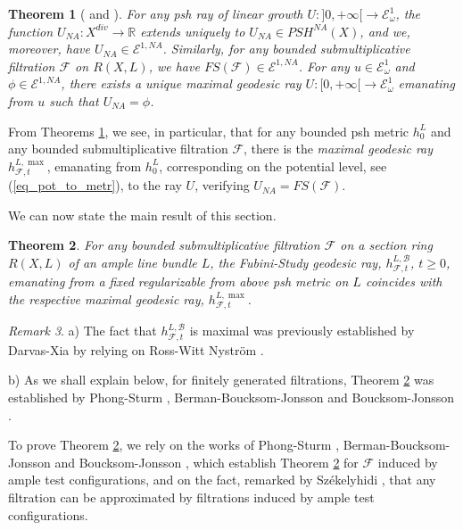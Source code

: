 \documentclass[12pt]{article}
\numberwithin{equation}{section}
\theoremstyle{theorem}
\newtheorem{thm}{Theorem}[section]
\theoremstyle{definition}
\theoremstyle{remark}
\newtheorem{rem}[thm]{Remark}
\newcommand{\real}{\mathbb{R}}
\begin{document}
	\begin{thm}[{\cite[Theorems 6.2, 6.4 and 6.6]{BerBouckJonYTD} and \cite[Lemma 4.3]{BouckJohn21}}]\label{thm_lin_grwth_e1}
 		For any psh ray of linear growth $U : ]0, + \infty[ \to \mathcal{E}_{\omega}^1$, the function $U_{NA} : X^{div} \to \real$ extends uniquely to $U_{NA} \in PSH^{NA}(X)$, and we, moreover, have $U_{NA} \in \mathcal{E}^{1, NA}$. 
 		Similarly, for any bounded submultiplicative filtration $\mathcal{F}$ on $R(X, L)$, we have $FS(\mathcal{F}) \in \mathcal{E}^{1, NA}$. 
 		For any $u \in \mathcal{E}_{\omega}^1$ and $\phi \in \mathcal{E}^{1, NA}$, there exists a unique maximal geodesic ray $U : [0, + \infty[ \to \mathcal{E}_{\omega}^1$ emanating from $u$ such that $U_{NA} = \phi$.
 	\end{thm}
	From Theorems \ref{thm_lin_grwth_e1}, we see, in particular, that for any bounded psh metric $h^L_0$ and any bounded submultiplicative filtration $\mathcal{F}$, there is the \textit{maximal geodesic ray} $h^{L, \max}_{\mathcal{F}, t}$, emanating from $h^L_0$, corresponding on the potential level, see (\ref{eq_pot_to_metr}), to the ray $U$, verifying $U_{NA} = FS(\mathcal{F})$.
	\par 
	We can now state the main result of this section.
	\begin{thm}\label{thm_ray_coinc}
		For any bounded submultiplicative filtration $\mathcal{F}$ on a section ring $R(X, L)$ of an ample line bundle $L$, the Fubini-Study geodesic ray, $h^{L, \mathcal{B}}_{\mathcal{F}, t}$, $t \geq 0$, emanating from a fixed regularizable from above psh metric on $L$ coincides with the respective maximal geodesic ray, $h^{L, \max}_{\mathcal{F}, t}$.
	\end{thm}
	\begin{rem}\label{rem_ray_coinc}
		a)
		The fact that $h^{L, \mathcal{B}}_{\mathcal{F}, t}$ is maximal was previously established by Darvas-Xia \cite{DarvXiaTest} by relying on Ross-Witt Nystr{\"o}m \cite{RossNystAnalTConf}.
		\par 
		b) 
		As we shall explain below, for finitely generated filtrations, Theorem \ref{thm_ray_coinc} was established by Phong-Sturm \cite{PhongSturmDirMA}, Berman-Boucksom-Jonsson \cite{BerBouckJonYTD} and Boucksom-Jonsson \cite{BouckJohn21}.
	\end{rem}
	\par 
	To prove Theorem \ref{thm_ray_coinc}, we rely on the works of Phong-Sturm \cite{PhongSturmDirMA}, Berman-Boucksom-Jonsson \cite{BerBouckJonYTD} and Boucksom-Jonsson \cite{BouckJohn21}, which establish Theorem \ref{thm_ray_coinc} for $\mathcal{F}$ induced by ample test configurations, and on the fact, remarked by Sz{\'e}kelyhidi \cite{SzekeTestConf}, that any filtration can be approximated by filtrations induced by ample test configurations.
\end{document}
